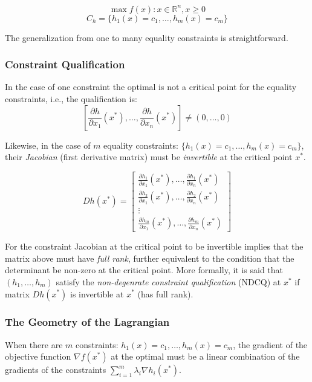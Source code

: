 \documentclass[11pt,]{article}
\begin{document}
\[
\max f(x): x\in \mathbb{R}^n, x\geq 0
\] \[
C_h = \{h_1(x)=c_1,\hdots, h_m(x)=c_m\}
\]

The generalization from one to many equality constraints is
straightforward.

\subsubsection{Constraint
Qualification}\label{constraint-qualification-1}

In the case of one constraint the optimal is not a critical point for
the equality constraints, i.e., the qualification is:
\[[\frac{\partial h}{\partial x_1}(x^*),\hdots,\frac{\partial h}{\partial x_n}(x^*)]\neq (0,\hdots,0)\]

Likewise, in the case of \(m\) equality constraints:
\(\{h_1(x)=c_1,\hdots, h_m(x)=c_m\}\), their \emph{Jacobian} (first
derivative matrix) must be \emph{invertible} at the critical point
\(x^*\).

\[
Dh(x^*) = \begin{bmatrix}
\frac{\partial h_1}{\partial x_1}(x^*),\hdots,\frac{\partial h_1}{\partial x_n}(x^*)\\
\frac{\partial h_2}{\partial x_1}(x^*),\hdots,\frac{\partial h_2}{\partial x_n}(x^*)\\
 \vdots \\
\frac{\partial h_m}{\partial x_1}(x^*),\hdots, \frac{\partial h_m}{\partial x_n}(x^*)
\end{bmatrix}
\]

For the constraint Jacobian at the critical point to be invertible
implies that the matrix above must have \emph{full rank}, further
equivalent to the condition that the determinant be non-zero at the
critical point. More formally, it is said that \((h_1,\hdots,h_m)\)
satisfy the \emph{non-degenrate constraint qualification} (NDCQ) at
\(x^*\) if matrix \(Dh(x^*)\) is invertible at \(x^*\) (has full rank).

\subsubsection{The Geometry of the
Lagrangian}\label{the-geometry-of-the-lagrangian}

When there are \(m\) constraints: \(h_1(x)=c_1,\hdots,h_m(x)=c_m\), the
gradient of the objective function \(\nabla f(x^*)\) at the optimal must
be a linear combination of the gradients of the constraints
\(\sum_{i=1}^m \lambda_i \nabla h_i(x^*)\).
\end{document}
